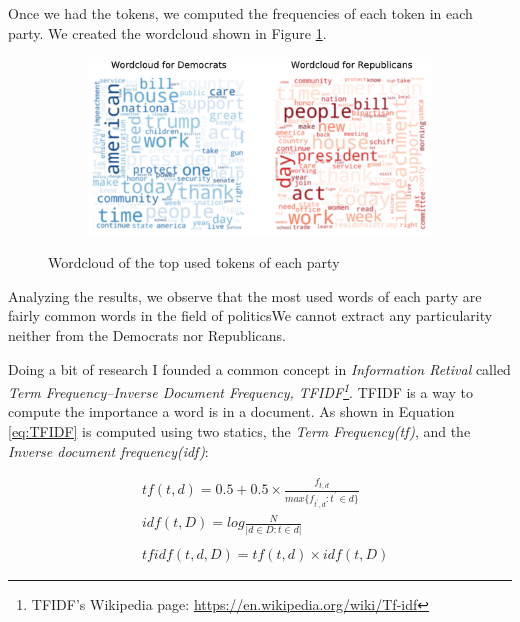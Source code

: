 \documentclass{article}
\begin{document}
Once we had the tokens, we computed the frequencies of each token in each party. We created the wordcloud shown in Figure \ref{fig:WordCloud100}.

\begin{figure}[H]
    \centering
    \begin{subfigure}{.8\textwidth}
        \centering
        \includegraphics[width=1\textwidth]{./img/WordCloud100.pdf}
    \end{subfigure}
    \caption{Wordcloud of the top used tokens of each party}
    \label{fig:WordCloud100}
\end{figure}

Analyzing the results, we observe that the most used words of each party are fairly common words in the field of politicsWe cannot extract any particularity neither from the Democrats nor Republicans.

Doing a bit of research I founded a common concept in \textit{Information Retival} called \textit{Term Frequency–Inverse Document Frequency, TFIDF\footnote{TFIDF's Wikipedia page: \url{https://en.wikipedia.org/wiki/Tf-idf}}}. TFIDF is a way to compute the importance a word is in a document. As shown in Equation \ref{eq:TFIDF} is computed using two statics, the \textit{Term Frequency(tf)}, and the \textit{Inverse document frequency(idf)}:

\begin{equation} \label{eq:TFIDF}
    \begin{split}
        & tf(t,d) = 0.5 + 0.5\times \frac{f_{t,d}}{max\{f_{t^{'},d}: t^{'} \in d\}} \\
        & idf(t,D) = log \frac{N}{|d\in D:t\in d|} \\ \\
        & tfidf(t,d,D)  = tf(t,d)\times idf(t,D) 
    \end{split}
\end{equation}
\end{document}
